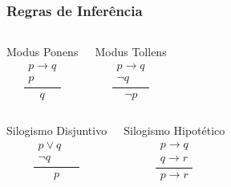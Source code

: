 \documentclass[aspectratio=169]{beamer} %
\begin{document}
\begin{frame}
\frametitle{Regras de Inferência}

	\begin{columns}[c]
	\large
\begin{block}{Modus Ponens}
	\large
	\begin{equation*}
	\frac{\begin{array}{l} p \rightarrow q \\ p\end{array}}{q}
	\end{equation*}
\end{block}	

\begin{block}{ Modus Tollens}
	\large
	\begin{equation*}
	\frac{\begin{array}{l} p \rightarrow q \\ \neg q\end{array}}{\neg p}
	\end{equation*}
\end{block}	
\end{columns}\vfill

	\begin{columns}[c]
	\large
	\begin{block}{Silogismo Disjuntivo}
		\large
		\begin{equation*}
	\frac{\begin{array}{ll} p \vee q & \\ \neg q & ~~\end{array}}{p}	
		\end{equation*}
	\end{block}
	
	\begin{block}{Silogismo Hipotético}
		\large
		\begin{equation*}
	\frac{\begin{array}{l} p \rightarrow q \\ q \rightarrow r \end{array}}{p \rightarrow r}	
		\end{equation*}
	\end{block}	
\end{columns}
\end{frame}
\end{document}

